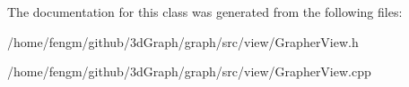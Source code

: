 The documentation for this class was generated from the following files\+:\begin{DoxyCompactItemize}
\item 
/home/fengm/github/3d\+Graph/graph/src/view/Grapher\+View.\+h\item 
/home/fengm/github/3d\+Graph/graph/src/view/Grapher\+View.\+cpp\end{DoxyCompactItemize}
